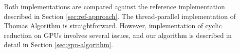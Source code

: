 \documentclass{article}
\begin{document}
    Both implementations are compared against the reference implementation
    described in Section \ref{sec:ref-approach}.
    The thread-parallel implementation of Thomas Algorithm is
    straightforward.
    However, implementation of cyclic reduction on GPUs involves several issues,
    and our algorithm is described in detail in Section \ref{sec:gpu-algorithm}.
\end{document}
